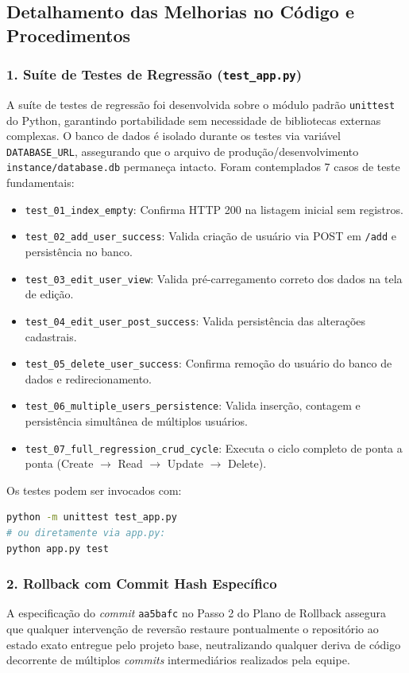 \documentclass[12pt,a4paper]{article}
\begin{document}
\subsection{Detalhamento das Melhorias no Código e Procedimentos}

\subsubsection{1. Suíte de Testes de Regressão (\texttt{test\_app.py})}

A suíte de testes de regressão foi desenvolvida sobre o módulo padrão \texttt{unittest}
do Python, garantindo portabilidade sem necessidade de bibliotecas externas complexas.
O banco de dados é isolado durante os testes via variável \texttt{DATABASE\_URL},
assegurando que o arquivo de produção/desenvolvimento \texttt{instance/database.db}
permaneça intacto. Foram contemplados 7 casos de teste fundamentais:

\begin{itemize}[nosep]
  \item \texttt{test\_01\_index\_empty}: Confirma HTTP 200 na listagem inicial sem registros.
  \item \texttt{test\_02\_add\_user\_success}: Valida criação de usuário via POST em \texttt{/add} e persistência no banco.
  \item \texttt{test\_03\_edit\_user\_view}: Valida pré-carregamento correto dos dados na tela de edição.
  \item \texttt{test\_04\_edit\_user\_post\_success}: Valida persistência das alterações cadastrais.
  \item \texttt{test\_05\_delete\_user\_success}: Confirma remoção do usuário do banco de dados e redirecionamento.
  \item \texttt{test\_06\_multiple\_users\_persistence}: Valida inserção, contagem e persistência simultânea de múltiplos usuários.
  \item \texttt{test\_07\_full\_regression\_crud\_cycle}: Executa o ciclo completo de ponta a ponta (Create $\rightarrow$ Read $\rightarrow$ Update $\rightarrow$ Delete).
\end{itemize}

Os testes podem ser invocados com:
\begin{lstlisting}[language=bash, caption={Comandos para disparo dos testes de regressão.}]
python -m unittest test_app.py
# ou diretamente via app.py:
python app.py test
\end{lstlisting}

\subsubsection{2. Rollback com Commit Hash Específico}

A especificação do \textit{commit} \texttt{aa5bafc} no Passo 2 do Plano de Rollback
assegura que qualquer intervenção de reversão restaure pontualmente o repositório
ao estado exato entregue pelo projeto base, neutralizando qualquer deriva de código
decorrente de múltiplos \textit{commits} intermediários realizados pela equipe.

\end{document}
